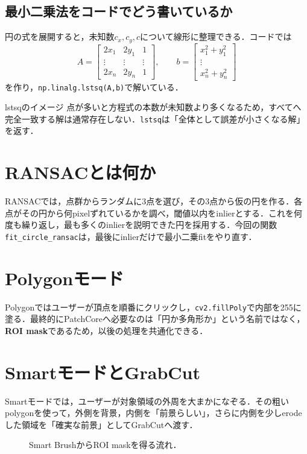 \documentclass[a4paper,11pt]{ltjsreport}
\begin{document}
\subsection{最小二乗法をコードでどう書いているか}
円の式を展開すると，未知数\(c_x,c_y,c\)について線形に整理できる．コードでは
\[
A=\begin{bmatrix}
2x_1 & 2y_1 & 1\\
\vdots & \vdots & \vdots\\
2x_n & 2y_n & 1
\end{bmatrix},\qquad
b=\begin{bmatrix}
x_1^2+y_1^2\\
\vdots\\
x_n^2+y_n^2
\end{bmatrix}
\]
を作り，\texttt{np.linalg.lstsq(A,b)}で解いている．

\begin{pointbox}{lstsqのイメージ}
点が多いと方程式の本数が未知数より多くなるため，すべてへ完全一致する解は通常存在しない．\texttt{lstsq}は「全体として誤差が小さくなる解」を返す．
\end{pointbox}

\section{RANSACとは何か}
RANSACでは，点群からランダムに3点を選び，その3点から仮の円を作る．各点がその円から何pixelずれているかを調べ，閾値以内をinlierとする．これを何度も繰り返し，最も多くのinlierを説明できた円を採用する．今回の関数\texttt{fit\_circle\_ransac}は，最後にinlierだけで最小二乗fitをやり直す．

\section{Polygonモード}
Polygonではユーザーが頂点を順番にクリックし，\texttt{cv2.fillPoly}で内部を255に塗る．最終的にPatchCoreへ必要なのは「円か多角形か」という名前ではなく，\textbf{ROI mask}であるため，以後の処理を共通化できる．

\section{SmartモードとGrabCut}
Smartモードでは，ユーザーが対象領域の外周を大まかになぞる．その粗いpolygonを使って，外側を背景，内側を「前景らしい」，さらに内側を少しerodeした領域を「確実な前景」としてGrabCutへ渡す．

\begin{figure}[H]
\centering
{}
\caption{Smart BrushからROI maskを得る流れ．}
\end{figure}
\end{document}
